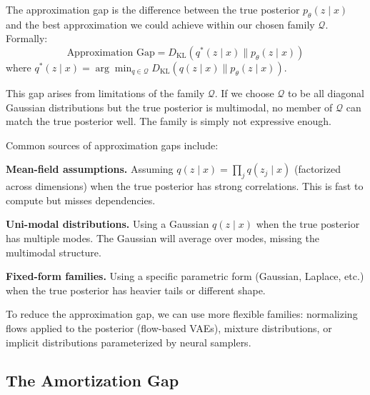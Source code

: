 The approximation gap is the difference between the true posterior $p_\theta(z \mid x)$ and the best approximation we could achieve within our chosen family $\mathcal{Q}$. Formally:
%
\begin{equation}
\text{Approximation Gap} = D_{\text{KL}}(q^*(z \mid x) \| p_\theta(z \mid x))
\end{equation}
%
where $q^*(z \mid x) = \arg\min_{q \in \mathcal{Q}} D_{\text{KL}}(q(z \mid x) \| p_\theta(z \mid x))$.

\vspace{0.3cm}

This gap arises from limitations of the family $\mathcal{Q}$. If we choose $\mathcal{Q}$ to be all diagonal Gaussian distributions but the true posterior is multimodal, no member of $\mathcal{Q}$ can match the true posterior well. The family is simply not expressive enough.

\vspace{0.3cm}

Common sources of approximation gaps include:

\vspace{0.3cm}

\textbf{Mean-field assumptions.} Assuming $q(z \mid x) = \prod_j q(z_j \mid x)$ (factorized across dimensions) when the true posterior has strong correlations. This is fast to compute but misses dependencies.

\vspace{0.3cm}

\textbf{Uni-modal distributions.} Using a Gaussian $q(z \mid x)$ when the true posterior has multiple modes. The Gaussian will average over modes, missing the multimodal structure.

\vspace{0.3cm}

\textbf{Fixed-form families.} Using a specific parametric form (Gaussian, Laplace, etc.) when the true posterior has heavier tails or different shape.

\vspace{0.3cm}

To reduce the approximation gap, we can use more flexible families: normalizing flows applied to the posterior (flow-based VAEs), mixture distributions, or implicit distributions parameterized by neural samplers.

\vspace{1.5em}

\subsection{The Amortization Gap}

